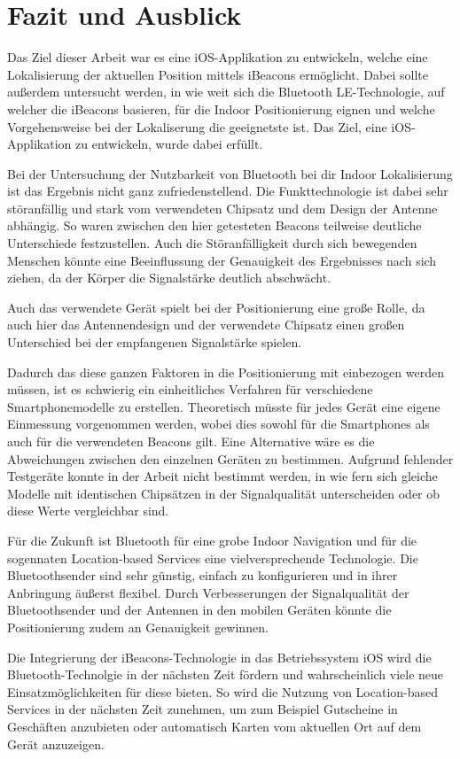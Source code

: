 \chapter{Fazit und Ausblick}
\label{chap:resume}

Das Ziel dieser Arbeit war es eine iOS-Applikation zu entwickeln, welche eine Lokalisierung der aktuellen Position mittels iBeacons ermöglicht. Dabei sollte außerdem untersucht werden, in wie weit sich die Bluetooth LE-Technologie, auf welcher die iBeacons basieren, für die Indoor Positionierung eignen und welche Vorgehensweise bei der Lokaliserung die geeignetste ist. Das Ziel, eine iOS-Applikation zu entwickeln, wurde dabei erfüllt. 

Bei der Untersuchung der Nutzbarkeit von Bluetooth bei dir Indoor Lokalisierung ist das Ergebnis nicht ganz zufriedenstellend. Die Funkttechnologie ist dabei sehr störanfällig und stark vom verwendeten Chipsatz und dem Design der Antenne abhängig. So waren zwischen den hier getesteten Beacons teilweise deutliche Unterschiede festzustellen. Auch die Störanfälligkeit durch sich bewegenden Menschen könnte eine Beeinflussung der Genauigkeit des Ergebnisses nach sich ziehen, da der Körper die Signalstärke deutlich abschwächt.

Auch das verwendete Gerät spielt bei der Positionierung eine große Rolle, da auch hier das Antennendesign und der verwendete Chipsatz einen großen Unterschied bei der empfangenen Signalstärke spielen. 

Dadurch das diese ganzen Faktoren in die Positionierung mit einbezogen werden müssen, ist es schwierig ein einheitliches Verfahren für verschiedene Smartphonemodelle zu erstellen. Theoretisch müsste für jedes Gerät eine eigene Einmessung vorgenommen werden, wobei dies sowohl für die Smartphones als auch für die verwendeten Beacons gilt.
Eine Alternative wäre es die Abweichungen zwischen den einzelnen Geräten zu bestimmen. Aufgrund fehlender Testgeräte konnte in der Arbeit nicht bestimmt werden, in wie fern sich gleiche Modelle mit identischen Chipsätzen in der Signalqualität unterscheiden oder ob diese Werte vergleichbar sind.

Für die Zukunft ist Bluetooth für eine grobe Indoor Navigation und für die sogennaten Location-based Services eine vielversprechende Technologie. Die Bluetoothsender sind sehr günstig, einfach zu konfigurieren und in ihrer Anbringung äußerst flexibel. Durch Verbesserungen der Signalqualität der Bluetoothsender und der Antennen in den mobilen Geräten könnte die Positionierung zudem an Genauigkeit gewinnen.

Die Integrierung der iBeacons-Technologie in das Betriebssystem iOS wird die Bluetooth-Technolgie in der nächsten Zeit fördern und wahrscheinlich viele neue Einsatzmöglichkeiten für diese bieten. So wird die Nutzung von Location-based Services in der nächsten Zeit zunehmen, um zum Beispiel Gutscheine in Geschäften anzubieten oder automatisch Karten vom aktuellen Ort auf dem Gerät anzuzeigen.